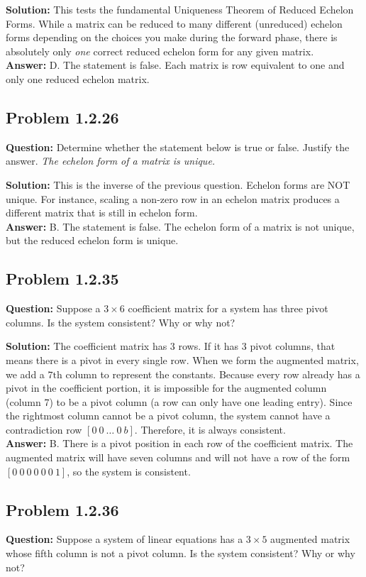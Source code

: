 \documentclass[11pt]{article}
\begin{document}
\textbf{Solution:}
This tests the fundamental Uniqueness Theorem of Reduced Echelon Forms. While a matrix can be reduced to many different (unreduced) echelon forms depending on the choices you make during the forward phase, there is absolutely only \textit{one} correct reduced echelon form for any given matrix.
\\
\textbf{Answer:} D. The statement is false. Each matrix is row equivalent to one and only one reduced echelon matrix.


\subsection*{Problem 1.2.26}
\textbf{Question:} Determine whether the statement below is true or false. Justify the answer.
\textit{The echelon form of a matrix is unique.}

\textbf{Solution:}
This is the inverse of the previous question. Echelon forms are NOT unique. For instance, scaling a non-zero row in an echelon matrix produces a different matrix that is still in echelon form.
\\
\textbf{Answer:} B. The statement is false. The echelon form of a matrix is not unique, but the reduced echelon form is unique.


\subsection*{Problem 1.2.35}
\textbf{Question:} Suppose a $3 \times 6$ coefficient matrix for a system has three pivot columns. Is the system consistent? Why or why not?

\textbf{Solution:}
The coefficient matrix has $3$ rows. If it has $3$ pivot columns, that means there is a pivot in every single row. 
When we form the augmented matrix, we add a $7\text{th}$ column to represent the constants. 
Because every row already has a pivot in the coefficient portion, it is impossible for the augmented column (column 7) to be a pivot column (a row can only have one leading entry). 
Since the rightmost column cannot be a pivot column, the system cannot have a contradiction row $[0 \ 0 \ \dots \ 0 \ b]$. Therefore, it is always consistent.
\\
\textbf{Answer:} B. There is a pivot position in each row of the coefficient matrix. The augmented matrix will have seven columns and will not have a row of the form $[0 \ 0 \ 0 \ 0 \ 0 \ 0 \ 1]$, so the system is consistent.


\subsection*{Problem 1.2.36}
\textbf{Question:} Suppose a system of linear equations has a $3 \times 5$ augmented matrix whose fifth column is not a pivot column. Is the system consistent? Why or why not?
\end{document}

